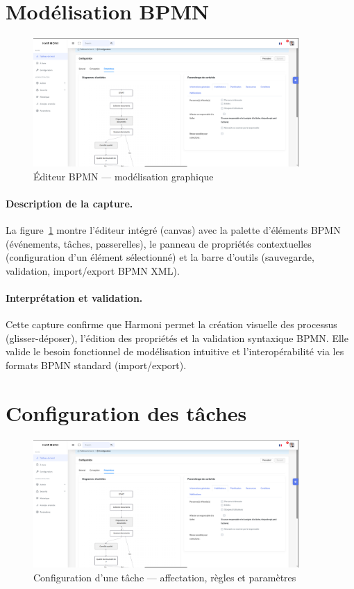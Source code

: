 \section{Modélisation BPMN}

\begin{figure}[H]
    \centering
    \includegraphics[width=0.9\textwidth]{Images/configuration.png}
    \caption{Éditeur BPMN — modélisation graphique}
    \label{fig:modelisation}
\end{figure}

\paragraph{Description de la capture.}  
La figure~\ref{fig:modelisation} montre l’éditeur intégré (canvas) avec la palette d’éléments BPMN (événements, tâches, passerelles), le panneau de propriétés contextuelles (configuration d’un élément sélectionné) et la barre d’outils (sauvegarde, validation, import/export BPMN XML).

\paragraph{Interprétation et validation.}  
Cette capture confirme que Harmoni permet la création visuelle des processus (glisser-déposer), l’édition des propriétés et la validation syntaxique BPMN. Elle valide le besoin fonctionnel de modélisation intuitive et l’interopérabilité via les formats BPMN standard (import/export).

\section{Configuration des tâches}

\begin{figure}[H]
    \centering
    \includegraphics[width=0.9\textwidth]{Images/configuration.png}
    \caption{Configuration d’une tâche — affectation, règles et paramètres}
    \label{fig:configuration}
\end{figure}

